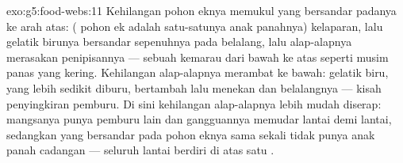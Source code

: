\begin{solution}{exo:g5:food-webs:11}
Kehilangan pohon eknya memukul yang bersandar padanya ke arah atas:
 ( pohon ek adalah satu-satunya anak panahnya) kelaparan,
lalu gelatik birunya bersandar sepenuhnya pada belalang, lalu
alap-alapnya merasakan penipisannya --- sebuah kemarau dari bawah ke
atas seperti musim panas yang kering. Kehilangan alap-alapnya merambat
ke bawah: gelatik biru, yang lebih sedikit diburu, bertambah lalu
menekan  dan belalangnya --- kisah penyingkiran pemburu. Di sini
kehilangan alap-alapnya lebih mudah diserap: mangsanya punya pemburu
lain dan gangguannya memudar lantai demi lantai, sedangkan yang
bersandar pada pohon eknya sama sekali tidak punya anak panah cadangan
--- seluruh lantai  berdiri di atas satu .
\end{solution}
